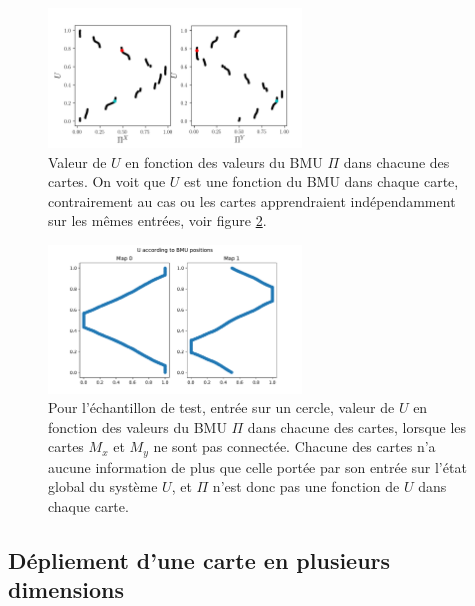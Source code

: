 \begin{figure}
\centering
\includegraphics[width = 0.6\textwidth]{XU_YU.pdf}
\caption{Valeur de $U$ en fonction des valeurs du BMU $\Pi$ dans chacune des cartes. On voit que $U$ est une fonction du BMU dans chaque carte, contrairement au cas ou les cartes apprendraient indépendamment sur les mêmes entrées, voir figure \ref{fig:piu_indep}.}
\label{fig:piu}
\end{figure}

\begin{figure}
\centering
\includegraphics[width = 0.6\textwidth]{xu_yu_unco.pdf}
\caption{Pour l'échantillon de test, entrée sur un cercle, valeur de $U$ en fonction des valeurs du BMU $\Pi$ dans chacune des cartes, lorsque les cartes $M_x$ et $M_y$ ne sont pas connectée. Chacune des cartes n'a aucune information de plus que celle portée par son entrée sur l'état global du système $U$, et $\Pi$ n'est donc pas une fonction de $U$ dans chaque carte. }
\label{fig:piu_indep}
\end{figure}


\subsection{Dépliement d'une carte en plusieurs dimensions}

